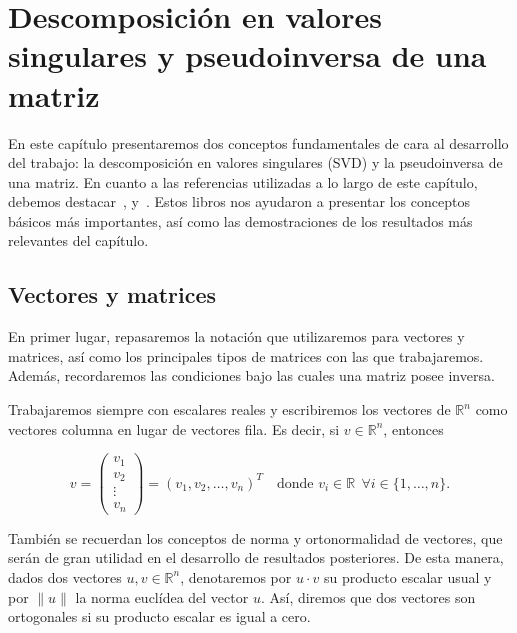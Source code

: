\chapter{Descomposición en valores singulares y pseudoinversa de una matriz}\label{ch:descomposicion-valores-singulares-pseudoinversa}

En este capítulo presentaremos dos conceptos fundamentales de cara al desarrollo del trabajo: la descomposición en valores singulares (SVD) y la pseudoinversa de una matriz. En cuanto a las referencias utilizadas a lo largo de este capítulo, debemos destacar~\cite{Friedberg2014linear}, \cite{Strang2023} y~\cite{Poole2011}. Estos libros nos ayudaron a presentar los conceptos básicos más importantes, así como las demostraciones de los resultados más relevantes del capítulo.\newline

\section{Vectores y matrices}\label{sec:vectores-matrices}

En primer lugar, repasaremos la notación que utilizaremos para vectores y matrices, así como los principales tipos de matrices con las que trabajaremos. Además, recordaremos las condiciones bajo las cuales una matriz posee inversa.\newline

Trabajaremos siempre con escalares reales y escribiremos los vectores de $\mathbb{R}^{n}$ como vectores columna en lugar de vectores fila. Es decir, si $v \in \mathbb{R}^{n}$, entonces

\[ 
    v = \begin{pmatrix} 
        v_{1} \\ 
        v_{2} \\ 
        \vdots \\
        v_{n}
    \end{pmatrix} = {(v_{1}, v_{2}, \ldots, v_{n})}^{T} \quad \text{donde } v_i \in \mathbb{R} \ \ \forall i \in \{1, \ldots, n \}.
\]

También se recuerdan los conceptos de norma y ortonormalidad de vectores, que serán de gran utilidad en el desarrollo de resultados posteriores. De esta manera, dados dos vectores $u, v \in \mathbb{R}^{n}$, denotaremos por $u \cdot v$ su producto escalar usual y por $\| u \|$ la norma euclídea del vector $u$. Así, diremos que dos vectores son ortogonales si su producto escalar es igual a cero.\newline

